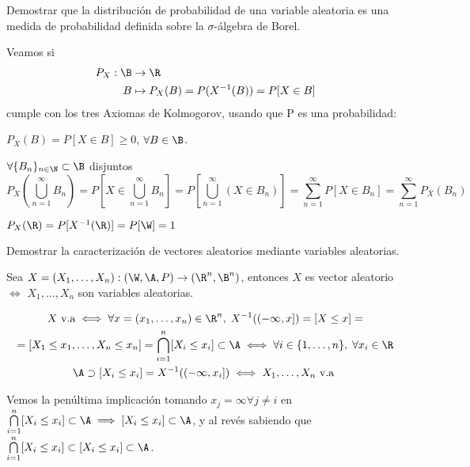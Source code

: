 \begin{ejer}
  Demostrar que la distribución de probabilidad de una variable aleatoria es una medida de probabilidad definida sobre la $\sigma$-álgebra de Borel.
\end{ejer}

\begin{sol}
  Veamos si
  \begin{align*}
    P_X : \B & \to \R \\
    B & \mapsto P_X(B) = P(X^{-1}(B)) = P[X \in B]
  \end{align*}
  cumple con los tres Axiomas de Kolmogorov, usando que P es una probabilidad:

  \begin{nlist}
    \item $P_X(B) = P[X \in B] \geq 0$, $\forall B \in \B$.
    \item $\forall \{B_n\}_{n \in \N} \subset \B$ disjuntos $$ P_X(\bigcup \limits^\infty_{n = 1} B_n) = P[X \in \bigcup \limits^\infty_{n = 1} B_n] = P[\bigcup \limits^\infty_{n = 1} (X \in B_n)] = \sum \limits^\infty_{n = 1} P[X \in B_n] = \sum \limits^\infty_{n = 1} P_X(B_n)$$
    \item $P_X(\R) = P[X^{-1}(\R)] = P[\W] = 1$
  \end{nlist}
\end{sol}

\begin{ejer}
  Demostrar la caracterización de vectores aleatorios mediante variables aleatorias.
\end{ejer}

\begin{sol}
  Sea $X = (X_1, \ldots, X_n) : (\W, \A, P) \to (\R^n, \B^n)$, entonces $X$ es vector aleatorio $\iff$ $X_1, \ldots, X_n$ son variables aleatorias.

  \begin{multline*}
    X \text{ v.a} \iff \forall x = (x_1, \ldots, x_n) \in \R^n, \; X^{-1}((-\infty, x]) = [X \leq x] = \\ =  [X_1 \leq x_1, \ldots, X_n \leq x_n] = \bigcap \limits^n_{i = 1} [X_i \leq x_i] \subset \A \iff \forall i \in \{1, \ldots, n\}, \; \forall x_i \in \R \\ \A \supset [X_i \leq x_i] = X^{-1}((-\infty, x_i]) \iff X_1, \ldots, X_n \text{ v.a }
  \end{multline*}

  Vemos la penúltima implicación tomando $x_j = \infty \forall j \neq i$ en $\bigcap \limits^n_{i = 1} [X_i \leq x_i] \subset \A \implies [X_i \leq x_i] \subset \A$, y al revés sabiendo que $\bigcap \limits^n_{i = 1} [X_i \leq x_i] \subset [X_i \leq x_i] \subset \A$.
\end{sol}

